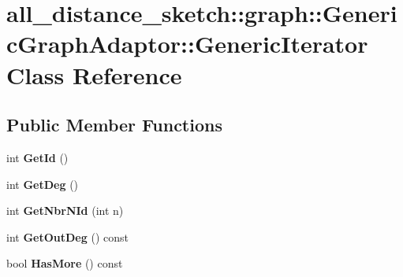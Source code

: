 \hypertarget{classall__distance__sketch_1_1graph_1_1GenericGraphAdaptor_1_1GenericIterator}{}\section{all\+\_\+distance\+\_\+sketch\+:\+:graph\+:\+:Generic\+Graph\+Adaptor\+:\+:Generic\+Iterator Class Reference}
\label{classall__distance__sketch_1_1graph_1_1GenericGraphAdaptor_1_1GenericIterator}
\subsection*{Public Member Functions}
\begin{DoxyCompactItemize}
\item 
\hypertarget{classall__distance__sketch_1_1graph_1_1GenericGraphAdaptor_1_1GenericIterator_ad5136d64be3a7f5c652299f408bb90d8}{}int {\bfseries Get\+Id} ()\label{classall__distance__sketch_1_1graph_1_1GenericGraphAdaptor_1_1GenericIterator_ad5136d64be3a7f5c652299f408bb90d8}

\item 
\hypertarget{classall__distance__sketch_1_1graph_1_1GenericGraphAdaptor_1_1GenericIterator_a05a9e1c61ece6961eb689d3ed18201b5}{}int {\bfseries Get\+Deg} ()\label{classall__distance__sketch_1_1graph_1_1GenericGraphAdaptor_1_1GenericIterator_a05a9e1c61ece6961eb689d3ed18201b5}

\item 
\hypertarget{classall__distance__sketch_1_1graph_1_1GenericGraphAdaptor_1_1GenericIterator_a4f0d48c730a443f10425782bd905bd26}{}int {\bfseries Get\+Nbr\+N\+Id} (int n)\label{classall__distance__sketch_1_1graph_1_1GenericGraphAdaptor_1_1GenericIterator_a4f0d48c730a443f10425782bd905bd26}

\item 
\hypertarget{classall__distance__sketch_1_1graph_1_1GenericGraphAdaptor_1_1GenericIterator_a0ee0bac1b7d1b3527df24be0a6077d54}{}int {\bfseries Get\+Out\+Deg} () const \label{classall__distance__sketch_1_1graph_1_1GenericGraphAdaptor_1_1GenericIterator_a0ee0bac1b7d1b3527df24be0a6077d54}

\item 
\hypertarget{classall__distance__sketch_1_1graph_1_1GenericGraphAdaptor_1_1GenericIterator_a652bfda1258dd48a6553fd59e36eb6d0}{}bool {\bfseries Has\+More} () const \label{classall__distance__sketch_1_1graph_1_1GenericGraphAdaptor_1_1GenericIterator_a652bfda1258dd48a6553fd59e36eb6d0}


\end{DoxyCompactItemize}
